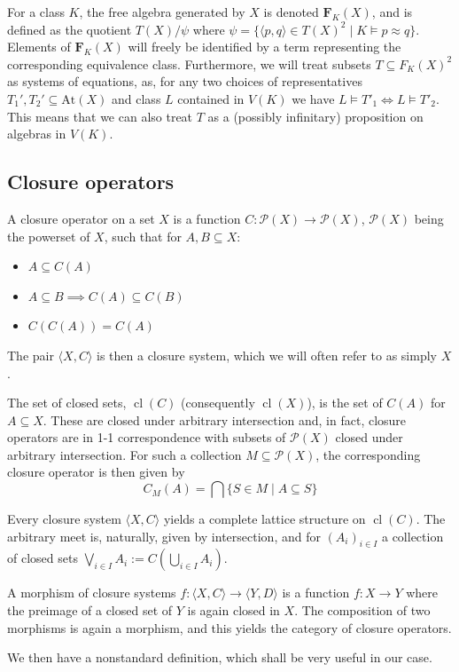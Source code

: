 \documentclass{article}
\theoremstyle{plain}
\theoremstyle{definition}
\begin{document}
For a class $K$, the free algebra generated by $X$ is denoted $\mathbf{F}_K(X)$, and is defined as the quotient $T(X)/\psi$ where $\psi = \{ \langle p, q\rangle \in T(X)^2 \mid K\models p\approx q\}$.
Elements of $\mathbf{F}_K(X)$ will freely be identified by a term representing the corresponding  equivalence class.
Furthermore, we will treat subsets $T \subseteq F_K(X)^2$ as systems of equations, as, for any two choices of representatives $T_1', T_2' \subseteq \text{At}(X)$ and class $L$ contained in $V(K)$ we have $L \models T'_1 \iff L \models T'_2$.
This means that we can also treat $T$ as a (possibly infinitary) proposition on algebras in $V(K)$.



\subsection{Closure operators}

A closure operator on a set $X$ is a function $C \colon \mathcal{P}(X)\rightarrow \mathcal{P}(X)$, $\mathcal{P}(X)$ being the powerset of $X$, such that for $A, B\subseteq X$:
\begin{itemize}
    \item $A \subseteq C(A)$
    \item $A\subseteq B \implies C(A)  \subseteq C(B)$
    \item $C(C(A)) = C(A)$
\end{itemize}
The pair $\langle X, C\rangle$ is then a closure system, which we will often refer to as simply $X$.\par
The set of closed sets, $\operatorname{cl}(C)$ (consequently $\operatorname{cl}(X)$), is the set of $C(A)$ for $A \subseteq X$.
These are closed under arbitrary intersection and, in fact, closure operators are in 1-1 correspondence with subsets of $\mathcal{P}(X)$ closed under arbitrary intersection.
For such a collection $M \subseteq \mathcal{P}(X)$, the corresponding closure operator is then given by
$$C_M(A) = \bigcap \{ S \in M \mid A\subseteq S\}$$

Every closure system $\langle X, C\rangle$ yields a complete lattice structure on $\operatorname{cl}(C)$.
The arbitrary meet is, naturally, given by intersection, and for $(A_i)_{i \in I}$ a collection of closed sets $\bigvee_{i\in I} A_i := C(\bigcup_{i \in I} A_i)$.\par

A morphism of closure systems $f \colon \langle X, C\rangle \rightarrow \langle Y, D\rangle$ is a function $f\colon X\rightarrow Y$ where the preimage of a closed set of $Y$ is again closed in $X$.
The composition of two morphisms is again a morphism, and this yields the category of closure operators.\par
We then have a nonstandard definition, which shall be very useful in our case.
\end{document}
